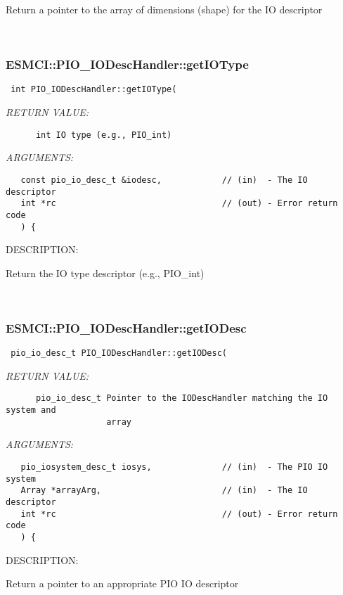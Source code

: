       Return a pointer to the array of dimensions (shape) for the IO descriptor
   
 
\mbox{}\hrulefill\
 
\subsubsection [ESMCI::PIO\_IODescHandler::getIOType] {ESMCI::PIO\_IODescHandler::getIOType}


  
\begin{verbatim} int PIO_IODescHandler::getIOType(\end{verbatim}{\em RETURN VALUE:}
\begin{verbatim}      int IO type (e.g., PIO_int)\end{verbatim}{\em ARGUMENTS:}
\begin{verbatim}   const pio_io_desc_t &iodesc,            // (in)  - The IO descriptor
   int *rc                                 // (out) - Error return code
   ) {\end{verbatim}
{\sf DESCRIPTION:\\ }


      Return the IO type descriptor (e.g., PIO_int)
   
 
\mbox{}\hrulefill\
 
\subsubsection [ESMCI::PIO\_IODescHandler::getIODesc] {ESMCI::PIO\_IODescHandler::getIODesc}


  
\begin{verbatim} pio_io_desc_t PIO_IODescHandler::getIODesc(\end{verbatim}{\em RETURN VALUE:}
\begin{verbatim}      pio_io_desc_t Pointer to the IODescHandler matching the IO system and
                    array\end{verbatim}{\em ARGUMENTS:}
\begin{verbatim}   pio_iosystem_desc_t iosys,              // (in)  - The PIO IO system
   Array *arrayArg,                        // (in)  - The IO descriptor
   int *rc                                 // (out) - Error return code
   ) {\end{verbatim}
{\sf DESCRIPTION:\\ }


      Return a pointer to an appropriate PIO IO descriptor
  
\setlength{\parskip}{\oldparskip}
\setlength{\parindent}{\oldparindent}
\setlength{\baselineskip}{\oldbaselineskip}
